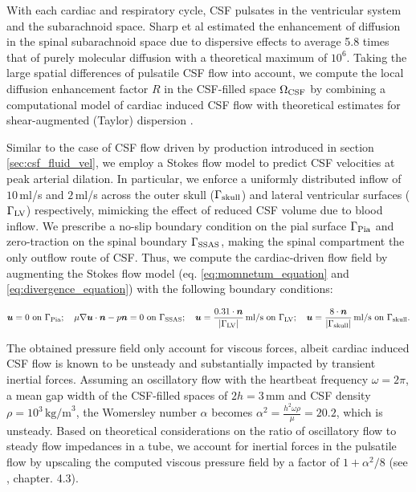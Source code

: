 \documentclass[fleqn,10pt]{wlscirep}
\begin{document}
With each cardiac and respiratory cycle, CSF pulsates in the ventricular system and the subarachnoid space. Sharp et al \cite{keith2019dispersion} estimated the enhancement of diffusion in the spinal subarachnoid space due to dispersive effects to average 5.8 times that of purely molecular diffusion with a theoretical maximum of $10^6$. Taking the large spatial differences of pulsatile CSF flow into account, we compute the local diffusion enhancement factor $R$ in the CSF-filled space $\Omega_{\rm CSF}$ by combining a computational model of cardiac induced CSF flow with theoretical estimates for shear-augmented (Taylor) dispersion \cite{taylor1953dispersion, watson1983diffusion}.

Similar to the case of CSF flow driven by production introduced in section \ref{sec:csf_fluid_vel}, we employ a Stokes flow model to predict CSF velocities at peak arterial dilation. In particular, we enforce a uniformly distributed inflow of $10$\,ml/s and $2$\,ml/s across the outer skull ($\Gamma_{\rm skull}$) and lateral ventricular surfaces ($\Gamma_{\rm LV}$) respectively, mimicking the effect of reduced CSF volume due to blood inflow. We prescribe a no-slip boundary condition on the pial surface $\Gamma_{\rm Pia}$ and zero-traction on the spinal boundary $\Gamma_{\rm SSAS}$, making the spinal compartment the only outflow route of CSF. Thus, we compute the cardiac-driven flow field by augmenting the Stokes flow model (eq. \ref{eq:momnetum_equation} and \ref{eq:divergence_equation}) with the following boundary conditions:

\begin{equation}\label{eq:cardiac_flow_bcs}
    \bm u = 0 \text{ on } \Gamma_{\rm Pia}; \quad 
    \mu \nabla \bm u \cdot \bm n - p \bm n = 0 \text{ on } \Gamma_{\rm SSAS}; \quad 
    \bm u = \frac{0.31 \cdot \bm n}{|\Gamma_{\rm LV}|} \,\text{ml/s} \text{ on } \Gamma_{\rm LV}; \quad
    \bm u = \frac{8 \cdot \bm n}{|\Gamma_{\rm skull}|} \,\text{ml/s} \text{ on } \Gamma_{\rm skull}.
\end{equation}

The obtained pressure field only account for viscous forces, albeit cardiac induced CSF flow is known to be unsteady and substantially impacted by transient inertial forces. Assuming an oscillatory flow with the heartbeat frequency $\omega = 2 \pi$, a mean gap width of the CSF-filled spaces of $2h=3$\,mm and CSF density $\rho=10^3\,\text{kg/m}^3$, the Womersley number $\alpha$ becomes $\alpha^2 = \frac{h^2 \omega \rho}{\mu} = 20.2$, which is unsteady. Based on theoretical considerations on the ratio of oscillatory flow to steady flow impedances in a tube, we account for inertial forces in the pulsatile flow by upscaling the computed viscous pressure field by a factor of $1 + \alpha^2 / 8$ (see \cite{van1998cardiovascular}, chapter. 4.3).
\end{document}
